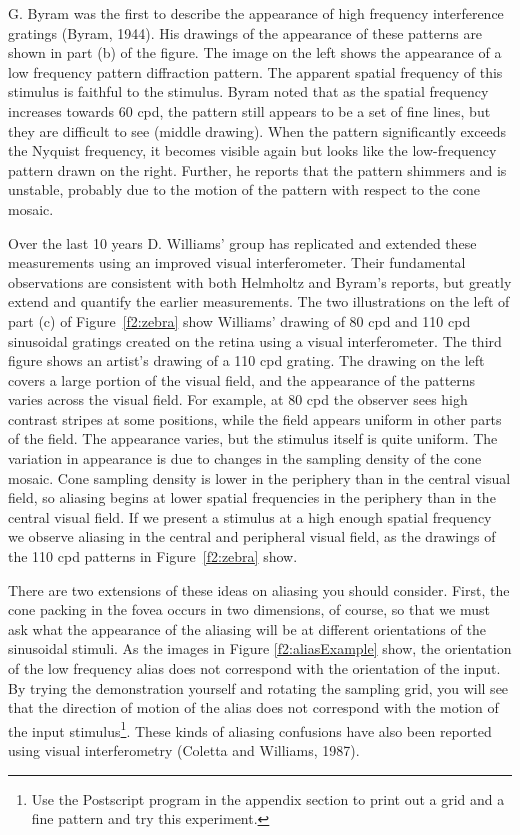 G. Byram was the first to describe the appearance of high frequency
interference gratings (Byram, 1944).
His drawings of the appearance of these patterns are shown in part (b)
of the figure.
The image on the left shows the appearance
of a low frequency pattern diffraction pattern.
The apparent spatial frequency of this stimulus
is faithful to the stimulus.
Byram noted that as the spatial frequency increases towards
60 cpd, the pattern still appears to
be a set of fine lines, but they are difficult to see (middle drawing).
When the pattern significantly exceeds the Nyquist frequency,
it becomes visible again but looks like the low-frequency pattern
drawn on the right.
Further, he reports that the pattern shimmers and is unstable, probably
due to the motion of the pattern with respect to the cone mosaic.
\nocite{Helmholtz,BYram,WilliamsAliasing}

Over the last 10 years D. Williams' group has replicated
and extended these measurements using an improved visual interferometer.
Their fundamental observations are consistent with
both Helmholtz and Byram's reports,
but greatly extend and quantify the earlier measurements.
The two illustrations on the left of part (c) of Figure~\ref{f2:zebra}
show Williams' drawing of 80 cpd and
110 cpd sinusoidal gratings created on the retina using a
visual interferometer.
The third figure shows an artist's drawing
of a 110 cpd grating.
The drawing on the left covers a large
portion of the visual field, and the appearance of the
patterns varies across the visual field.
For example, at 80 cpd the observer sees 
high contrast stripes at some positions,
while the field appears uniform in other parts of the field.
The appearance varies, but the stimulus itself is quite uniform.
The variation in appearance is 
due to changes in the sampling density of the cone mosaic.
Cone sampling density is lower in the periphery than in the
central visual field,
so aliasing begins at lower spatial frequencies in the periphery
than in the central visual field.
If we present a stimulus at a high enough spatial frequency
we observe aliasing in the central and peripheral visual field,
as the drawings of the 110 cpd patterns in Figure~\ref{f2:zebra} show.

There are two extensions of these ideas on aliasing you should consider.
First, the cone packing in the fovea occurs in two dimensions,
of course, so that we must ask what the appearance of the
aliasing will be at different orientations of the sinusoidal
stimuli.
As the images in Figure \ref{f2:aliasExample} 
show, the orientation of the low frequency alias
does not correspond with the orientation of the input.
By trying the demonstration yourself and rotating the
sampling grid, you will see that the direction of motion
of the alias does not correspond with the motion of the
input stimulus\footnote{
Use the Postscript program in the appendix
section to print out a grid and a fine pattern and try this experiment.
}.
These kinds of aliasing confusions have also been reported
using visual interferometry (Coletta and Williams, 1987).
\nocite{ColettaWilliams1987}


